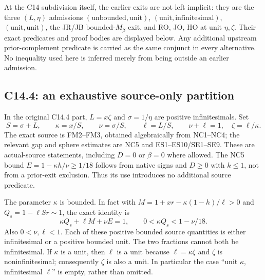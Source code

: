 At the C14 subdivision itself, the earlier exits are not left
implicit: they are the three $(L,\eta)$ admissions
$(\text{unbounded},\text{unit})$,
$(\text{unit},\text{infinitesimal})$,
$(\text{unit},\text{unit})$, the JR/JB bounded-$M_\beta$ exit,
and RO, JO, HO at unit $\eta,\zeta$.  Their exact predicates and
proof bodies are displayed below.  Any additional upstream
prior-complement predicate is carried as the same conjunct in
every alternative.  No inequality used here is inferred merely
from being outside an earlier admission.

\subsection{C14.4: an exhaustive source-only partition}
In the original C14.4 part, $L=x\zeta$ and $\sigma=1/\eta$ are
positive infinitesimals.  Set
\[
 S=\sigma+L,\qquad \kappa=x/S,\qquad
 \nu=\sigma/S,\qquad\ell=L/S,
 \qquad \nu+\ell=1,\quad\zeta=\ell/\kappa.          \tag{JC1}
\]
The exact source is FM2--FM3, obtained algebraically from NC1--NC4;
the relevant gap and sphere estimates are NC5 and ES1--ES10/SE1--SE9.
These are actual-source statements, including $D=0$ or $\beta=0$
where allowed.  The NC5 bound $E=1-\kappa h/\nu\ge1/18$ follows
from native signs and $D\ge0$ with $k\le1$, not from a prior-exit
exclusion.  Thus its use introduces no additional source predicate.

The parameter $\kappa$ is bounded.  In fact with
$M=1+xr-\kappa(1-h)/\ell>0$ and $Q_s=1-\ell Sr\sim1$,
the exact identity is
\[
 \kappa Q_s+\ell M+\nu E=1,
 \qquad 0<\kappa Q_s<1-\nu/18.                    \tag{JC2}
\]
Also $0<\nu,\ell<1$.  Each of these positive bounded source
quantities is either infinitesimal or a positive bounded unit.
The two fractions cannot both be infinitesimal.  If $\kappa$ is a
unit, then $\ell$ is a unit because $\ell=\kappa\zeta$ and
$\zeta$ is noninfinitesimal; consequently $\zeta$ is also a unit.
In particular the case ``unit $\kappa$, infinitesimal $\ell$'' is
empty, rather than omitted.

